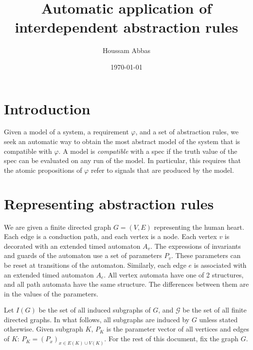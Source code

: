 \documentclass[11pt, oneside, reqno]{article}
\newcommand{\Gc}{\mathcal{G}}
\newcommand{\Ic}{\mathcal{I}}
\begin{document}
\title{Automatic application of interdependent abstraction rules}
\author{Houssam Abbas}
\date{\today}
\maketitle


\section{Introduction}
Given a model of a system, a requirement $\varphi$, and a set of abstraction rules, we seek an automatic way to obtain the most abstract model of the system that is compatible with $\varphi$.
A model is \emph{compatible} with a spec if the truth value of the spec can be evaluated on any run of the model.
In particular, this requires that the atomic propositions of $\varphi$ refer to signals that are produced by the model.

\section{Representing abstraction rules}
We are given a finite directed graph $G=(V,E)$ representing the human heart. 
Each edge is a conduction path, and each vertex is a node.
Each vertex $v$ is decorated with an extended timed automaton $A_v$.
The expressions of invariants and guards of the automaton use a set of parameters $P_v$. 
These parameters can be reset at transitions of the automaton.
Similarly, each edge $e$ is associated with an extended timed automaton $A_e$.
All vertex automata have one of 2 structures, and all path automata have the same structure. 
The differences between them are in the values of the parameters.

Let $I(G)$ be the set of all induced subgraphs of $G$, and $\Gc$ be the set of all finite directed graphs.
In what follows, all subgraphs are induced by $G$ unless stated otherwise.
Given subgraph $K$, $P_K$ is the parameter vector of all vertices and edges of $K$: $P_K = (P_x)_{x \in E(K) \cup V(K)}$.
For the rest of this document, fix the graph $G$.
\end{document}
